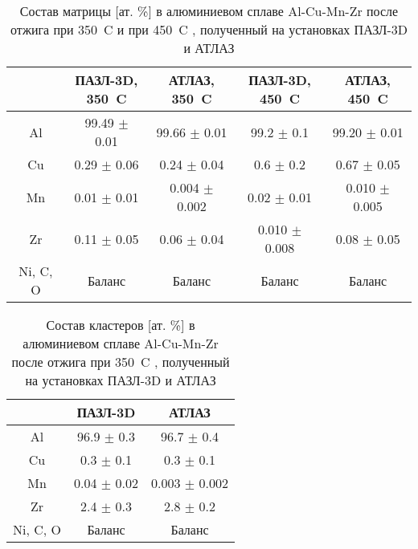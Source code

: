 \begin{table} [htbp]
	\centering
	\caption{Состав матрицы [ат. \%] в алюминиевом сплаве Al-Cu-Mn-Zr после отжига при 350~\textdegree C и при 450~\textdegree C \cite{scbibAPPLEvsATLAS}, полученный на установках ПАЗЛ-3D и АТЛАЗ}
	\label{tab:matrixAPPLEvsATLAS}
	\begin{SingleSpace}
		\begin{tabular} {| c | c | c | c | c |}
			\hline
			{} & \thead{ПАЗЛ-3D, \\ 350~\textdegree C} & \thead{АТЛАЗ, \\ 350~\textdegree C} & \thead{ПАЗЛ-3D, \\ 450~\textdegree C} & \thead{АТЛАЗ, \\ 450~\textdegree C} \\ \hline
			Al       & 99.49 $\pm$ 0.01  & 99.66 $\pm$ 0.01 & 99.2 $\pm$ 0.1  & 99.20 $\pm$ 0.01  \\ \hline
			Cu       & 0.29 $\pm$ 0.06   & 0.24 $\pm$ 0.04  & 0.6 $\pm$ 0.2  & 0.67 $\pm$ 0.05  \\ \hline
			Mn       & 0.01 $\pm$ 0.01 & 0.004 $\pm$ 0.002 & 0.02 $\pm$ 0.01  & 0.010 $\pm$ 0.005 \\ \hline
			Zr       & 0.11 $\pm$ 0.05   & 0.06 $\pm$ 0.04 & 0.010 $\pm$ 0.008  & 
			0.08 $\pm$ 0.05   \\ \hline
			Ni, C, O & Баланс & Баланс & Баланс & Баланс  \\ \hline			
		\end{tabular}
	\end{SingleSpace}
\end{table}

\begin{table} [htbp]
	\centering
	\caption{Состав кластеров [ат. \%] в алюминиевом сплаве Al-Cu-Mn-Zr после отжига при 350~\textdegree C \cite{scbibAPPLEvsATLAS}, полученный на установках ПАЗЛ-3D и АТЛАЗ}
	\label{tab:clustersAPPLEvsATLAS}
	\begin{SingleSpace}
		\begin{tabular} {| c | c | c |}
			\hline
			{} & ПАЗЛ-3D & АТЛАЗ \\ \hline
			Al       & 96.9 $\pm$ 0.3  & 96.7 $\pm$ 0.4   \\ \hline
			Cu       & 0.3 $\pm$ 0.1   & 0.3 $\pm$ 0.1    \\ \hline
			Mn       & 0.04 $\pm$ 0.02 & 0.003 $\pm$ 0.002  \\ \hline
			Zr       & 2.4 $\pm$ 0.3   & 2.8 $\pm$ 0.2    \\ \hline
			Ni, C, O & Баланс & Баланс   \\ \hline			
		\end{tabular}
	\end{SingleSpace}
\end{table}

